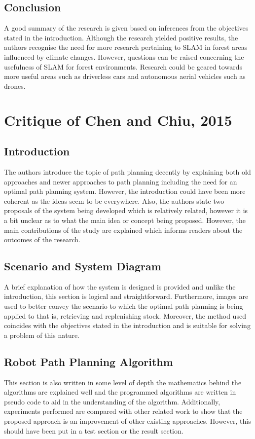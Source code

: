 \documentclass[a4paper, 12pt]{article}
\begin{document}
\subsection{Conclusion}
A good summary of the research is given based on inferences from the objectives stated in the introduction. Although the research yielded positive results, the authors recognise the need for more research pertaining to SLAM in forest areas influenced by climate changes. However, questions can be raised concerning the usefulness of SLAM for forest environments. Research could be geared towards more useful areas such as driverless cars and autonomous aerial vehicles such as drones.

\section{Critique of Chen and Chiu, 2015}

\subsection{Introduction}
The authors introduce the topic of path planning decently by explaining both old approaches and newer approaches to path planning including the need for an optimal path planning system. However, the introduction could have been more coherent as the ideas seem to be everywhere. Also, the authors state two proposals of the system being developed which is relatively related, however it is a bit unclear as to what the main idea or concept being proposed. However, the main contributions of the study are explained which informs readers about the outcomes of the research. 

\subsection{Scenario and System Diagram}
A brief explanation of how the system is designed is provided and unlike the introduction, this section is logical and straightforward. Furthermore, images are used to better convey the scenario to which the optimal path planning is being applied to that is, retrieving and replenishing stock. Moreover, the method used coincides with the objectives stated in the introduction and is suitable for solving a problem of this nature.


\subsection{Robot Path Planning Algorithm}
 This section is also written in some level of depth the mathematics behind the algorithms are explained well and the programmed algorithms are written in pseudo code to aid in the understanding of the algorithm. Additionally, experiments performed are compared with other related work to show that the proposed approach is an improvement of other existing approaches. However, this should have been put in a test section or the result section. 
\end{document}
